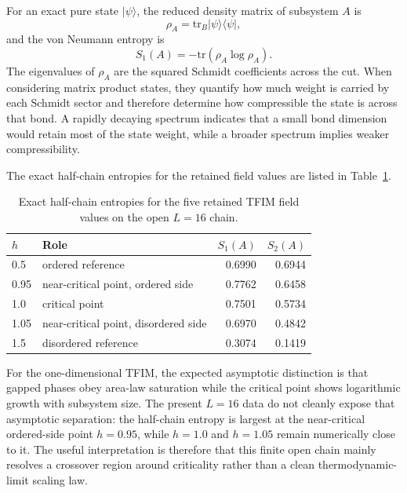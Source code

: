 \documentclass[11pt,a4paper]{article}
\begin{document}
    For an exact pure state $\lvert \psi \rangle$, the reduced density matrix of subsystem $A$ is
    \begin{equation}
        \rho_A = \mathrm{tr}_B \lvert \psi \rangle \langle \psi \rvert ,
    \end{equation}
    and the von Neumann entropy is
    \begin{equation}
        S_1(A) = -\mathrm{tr}(\rho_A \log \rho_A) .
    \end{equation}
    The eigenvalues of $\rho_A$ are the squared Schmidt coefficients across the cut. When considering matrix product states, they quantify how much weight is carried by each Schmidt sector and therefore determine how compressible the state is across that bond. A rapidly decaying spectrum indicates that a small bond dimension would retain most of the state weight, while a broader spectrum implies weaker compressibility.

    The exact half-chain entropies for the retained field values are listed in Table~\ref{tab:exact-entropies}.

    \begin{table}[H]
        \centering
        \begin{tabular}{llrr}
            \toprule
            $h$  & Role                                 & $S_1(A)$ & $S_2(A)$ \\
            \midrule
            0.5  & ordered reference                    & 0.6990   & 0.6944   \\
            0.95 & near-critical point, ordered side    & 0.7762   & 0.6458   \\
            1.0  & critical point                       & 0.7501   & 0.5734   \\
            1.05 & near-critical point, disordered side & 0.6970   & 0.4842   \\
            1.5  & disordered reference                 & 0.3074   & 0.1419   \\
            \bottomrule
        \end{tabular}
        \caption{Exact half-chain entropies for the five retained TFIM field values on the open $L=16$ chain.}
        \label{tab:exact-entropies}
    \end{table}

    For the one-dimensional TFIM, the expected asymptotic distinction is that gapped phases obey area-law saturation while the critical point shows logarithmic growth with subsystem size. The present $L=16$ data do not cleanly expose that asymptotic separation: the half-chain entropy is largest at the near-critical ordered-side point $h=0.95$, while $h=1.0$ and $h=1.05$ remain numerically close to it. The useful interpretation is therefore that this finite open chain mainly resolves a crossover region around criticality rather than a clean thermodynamic-limit scaling law.
\end{document}
